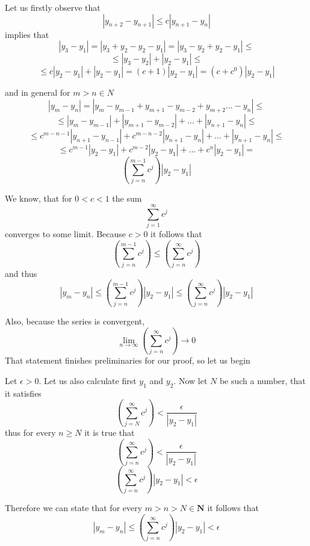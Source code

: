 \documentclass[11pt,oneside,titlepage]{book}
\begin{document}






Let us firstly observe that
$$|y_{n + 2} - y_{n + 1}| \leq c|y_{n + 1} - y_n|$$
implies that 
$$|y_3 - y_1| = |y_3 + y_2 - y_2 - y_1| = |y_3 - y_2 + y_2 - y_1| \leq $$
$$ \leq  |y_3 - y_2| + |y_2 - y_1| \leq$$
$$\leq c|y_2 - y_1| + |y_2 - y_1| =
(c + 1) |y_2 - y_1| = (c + c^0) |y_2 - y_1|$$

and in general for $m > n \in N$ 
$$|y_m - y_n| = 
|y_m - y_{m - 1} + y_{m + 1} - y_{m - 2} + y_{m + 2} ...  - y_n| \leq$$
$$ \leq |y_m - y_{m - 1}| + |y_{m + 1} - y_{m - 2}| + ... +
|y_{n + 1}  - y_n| \leq $$
$$ \leq c^{m - n - 1}|y_{n + 1} - y_{n - 1}| +
c^{m - n - 2}|y_{n + 1} - y_{n}| + ... +
|y_{n + 1}  - y_n| \leq  $$
$$ \leq c^{m  - 1}|y_{2} - y_{1}| +
c^{m - 2}|y_{2} - y_{1}| + ... +
c^n|y_{2}  - y_1| =  $$
$$\left(\sum_{j = n}^{m - 1}c^j\right)|y_2 - y_1|$$

We know, that for $0 < c < 1$ the sum
$$\sum_{j = 1}^{\infty}c^j$$
converges to some limit. Because $c > 0$ it follows that
$$\left(\sum_{j = n}^{m - 1}c^j\right)
\leq
\left(\sum_{j = n}^{\infty}c^j\right)$$
and thus
$$|y_m - y_n| \leq \left(\sum_{j = n}^{m - 1}c^j\right)|y_2 - y_1|
\leq \left(\sum_{j = n}^{\infty}c^j\right) |y_2 - y_1|$$

Also, because the series is convergent, 
$$\lim_{n \to \infty} \left(\sum_{j = n}^{\infty}c^j\right) \to 0$$
That statement finishes preliminaries for our proof, so let us begin

Let $\epsilon > 0$. Let us also calculate first $y_1$ and $y_2$.
Now let $N$ be such a number, that it satisfies 
$$\left(\sum_{j = N}^{\infty}c^j\right) < \frac{\epsilon}{|y_2 - y_1|}$$
thus for every $n \geq N$ it is true that
$$\left(\sum_{j = n}^{\infty}c^j\right) < \frac{\epsilon}{|y_2 - y_1|}$$
$$\left(\sum_{j = n}^{\infty}c^j\right)|y_2 - y_1| < \epsilon$$

Therefore we can state that for every $m > n > N \in \textbf{N}$ it follows
that 
$$|y_m - y_n| \leq 
\left(\sum_{j = n}^{\infty}c^j\right)|y_2 - y_1| < \epsilon$$
\end{document}
